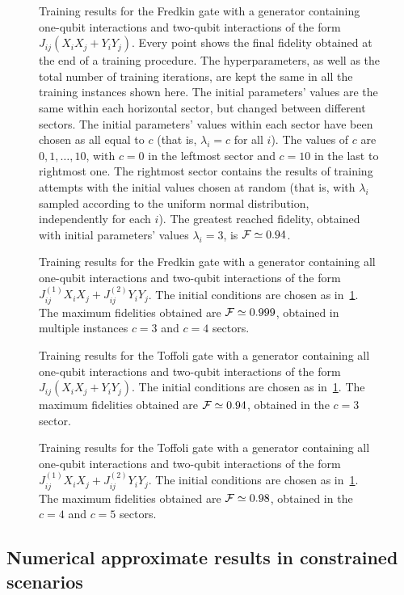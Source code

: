 \begin{figure}[htbp]
	\centering
	\caption{
		Training results for the Fredkin gate with a generator containing one-qubit interactions and two-qubit interactions of the form $J_{ij}(X_i X_j + Y_i Y_j)$.
		Every point shows the final fidelity obtained at the end of a training procedure.
		The hyperparameters, as well as the total number of training iterations, are kept the same in all the training instances shown here.
		The initial parameters' values are the same within each horizontal sector, but changed between different sectors.
		The initial parameters' values within each sector have been chosen as all equal to $c$ (that is, $\lambda_i=c$ for all $i$). The values of $c$ are $0, 1,\ldots, 10$, with $c=0$ in the leftmost sector and $c=10$ in the last to rightmost one.
		The rightmost sector contains the results of training attempts with the initial values chosen at random (that is, with $\lambda_i$ sampled according to the uniform normal distribution, independently for each $i$).
		The greatest reached fidelity, obtained with initial parameters' values $\lambda_i=3$, is ${\mathcal{F}}\simeq0.94$.
	}
\label{fig:fredkin_XX}
\end{figure}

\begin{figure}[htbp]
	\centering
	\caption{
		Training results for the Fredkin gate with a generator containing all one-qubit interactions and two-qubit interactions of the form $J^{(1)}_{ij}X_i X_j + J^{(2)}_{ij}Y_i Y_j$.
		The initial conditions are chosen as in~\cref{fig:fredkin_XX}.
		The maximum fidelities obtained are ${\mathcal{F}}\simeq0.999$, obtained in multiple instances $c=3$ and $c=4$ sectors.
	}
\label{fig:fredkin_XY}
\end{figure}

\begin{figure}[htbp]
	\centering
	\caption{
		Training results for the Toffoli gate with a generator containing all one-qubit interactions and two-qubit interactions of the form $J_{ij}(X_i X_j + Y_i Y_j)$.
		The initial conditions are chosen as in~\cref{fig:fredkin_XX}.
		The maximum fidelities obtained are ${\mathcal{F}}\simeq0.94$, obtained in the $c=3$ sector.
	}
	\label{fig:toffoli_XX}
\end{figure}

\begin{figure}[htbp]
	\centering
	\caption{
		Training results for the Toffoli gate with a generator containing all one-qubit interactions and two-qubit interactions of the form $J^{(1)}_{ij}X_i X_j + J^{(2)}_{ij}Y_i Y_j$.
		The initial conditions are chosen as in~\cref{fig:fredkin_XX}.
		The maximum fidelities obtained are ${\mathcal{F}}\simeq0.98$, obtained in the $c=4$ and $c=5$ sectors.
	}
	\label{fig:toffoli_XY}
\end{figure}

\subsection{Numerical approximate results in constrained scenarios}

